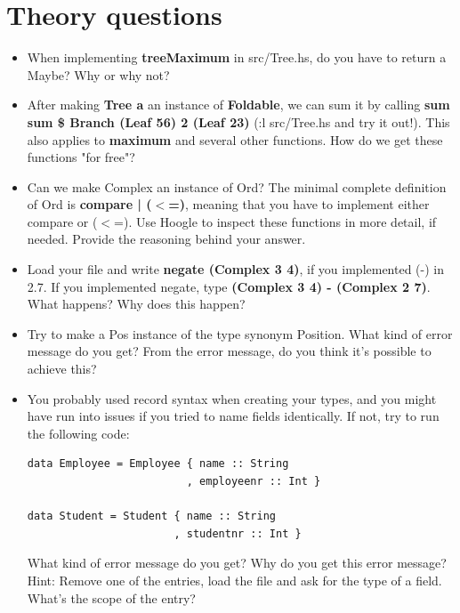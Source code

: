 \documentclass{article}
\begin{document}
\section{Theory questions}
\begin{itemize}
    \item When implementing \textbf{treeMaximum} in src/Tree.hs, do you have to return a Maybe? Why or why not?
    \item After making \textbf{Tree a} an instance of \textbf{Foldable}, we can sum it by calling \textbf{sum sum \$ Branch (Leaf 56) 2 (Leaf 23)} (:l src/Tree.hs and try it out!). This also applies to \textbf{maximum} and several other functions. How do we get these functions "for free"?
    \item Can we make Complex an instance of Ord? The minimal complete definition of Ord is \textbf{compare | ($<$=)}, meaning that you have to implement either compare or ($<$=). Use Hoogle to inspect these functions in more detail, if needed. Provide the reasoning behind your answer.
    \item Load your file and write \textbf{negate (Complex 3 4)}, if you implemented (-) in 2.7. If you implemented negate, type \textbf{(Complex 3 4) - (Complex 2 7)}. What happens? Why does this happen?
    \item Try to make a Pos instance of the type synonym Position. What kind of error message do you get? From the error message, do you think it's possible to achieve this?
    \item You probably used record syntax when creating your types, and you might have run into issues if you tried to name fields identically. If not, try to run the following code:
    \lstset{language=Haskell}
    \begin{lstlisting}
data Employee = Employee { name :: String
                         , employeenr :: Int }
                         
data Student = Student { name :: String
                       , studentnr :: Int }
    \end{lstlisting}
    What kind of error message do you get? Why do you get this error message? Hint: Remove one of the entries, load the file and ask for the type of a field. What's the scope of the entry?
\end{itemize}
\end{document}
